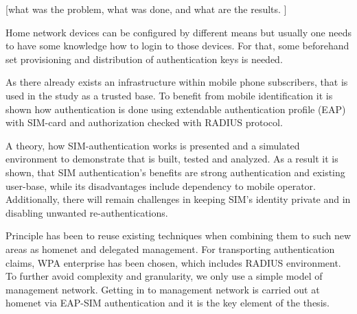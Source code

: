 \documentclass[12pt,a4paper,english]{tutthesis}
\begin{document}
[what was the problem, what was done, and what are the results. ]


Home network devices can be configured by different means but usually one needs 
to have some knowledge how to login to those devices. For that, 
some beforehand set provisioning and distribution of authentication keys is needed.

As there already exists an infrastructure within mobile phone subscribers,
that is used in the study as a trusted base.
To benefit from mobile identification it is shown how
 authentication  is done using extendable authentication profile (EAP) with SIM-card
and authorization checked with RADIUS protocol.




A theory, how SIM-authentication works is presented and a simulated environment
to demonstrate that is built, tested and analyzed.
As a result it is shown, that SIM authentication's benefits are strong
authentication and existing user-base, while its disadvantages include
dependency to mobile operator. Additionally, there will remain challenges in keeping SIM's identity private and in disabling unwanted re-authentications. 

Principle has been to reuse existing techniques when combining them to such new areas as homenet and delegated management.
 For transporting authentication claims, WPA enterprise has been chosen, which includes RADIUS environment.
To further avoid complexity and granularity, we
only use a simple model of management network. Getting in to management network is carried out at homenet via EAP-SIM authentication and it is the key element of the thesis.



\end{document}
